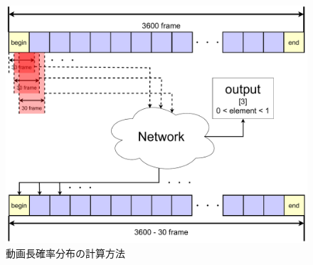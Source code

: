 \begin{figure}[b]
  \begin{center}
    \includegraphics[width=120mm]{images/chart/net_dist.pdf}
  \end{center}
  \caption{動画長確率分布の計算方法}
  \label{distchart}
\end{figure}

